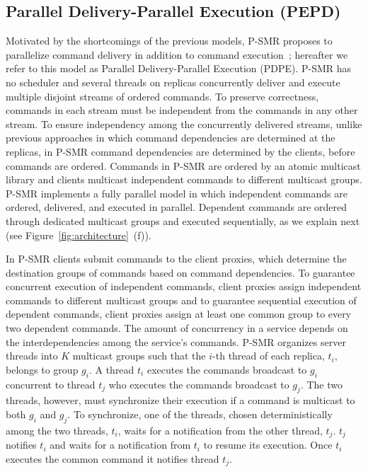 \documentclass[conference]{IEEEtran}
\begin{document}
\subsection{Parallel Delivery-Parallel Execution (PEPD)}
\label{sec:pepd}







Motivated by the shortcomings of the previous models, P-SMR proposes to parallelize command delivery in addition to command execution~\cite{p-smr}; hereafter we refer to this model as Parallel Delivery-Parallel Execution (PDPE). 
P-SMR has no scheduler and several threads on replicas concurrently deliver and execute multiple disjoint streams of ordered commands. 
To preserve correctness, commands in each stream must be independent from the commands in any other stream. 
To ensure independency among the concurrently delivered streams, unlike previous approaches in which command dependencies are determined at the replicas, in P-SMR command dependencies are determined by the clients, before commands are ordered. 
Commands in P-SMR are ordered by an atomic multicast library and clients multicast independent commands to different multicast groups. 
P-SMR implements a fully parallel model in which independent commands are ordered, delivered, and executed in parallel. 
Dependent commands are ordered through dedicated multicast groups and executed sequentially, as we explain next (see Figure~\ref{fig:architecture}~(f)). 





In P-SMR clients submit commands to the client proxies, which determine the destination groups of commands based on command dependencies. 
To guarantee concurrent execution of independent commands, client proxies assign independent commands to different multicast groups and to guarantee sequential execution of dependent commands, client proxies assign at least one common group to every two dependent commands. 
The amount of concurrency in a service depends on the interdependencies among the service's commands. 
P-SMR organizes server threads into $K$ multicast groups such that the $i$-th thread of each replica, $t_i$, belongs to group $g_i$. 
A thread $t_i$ executes the commands broadcast to $g_i$ concurrent to thread $t_j$ who executes the commands broadcast to $g_j$. 
The two threads, however, must synchronize their execution if a command is multicast to both $g_i$ and $g_j$. 
To synchronize, one of the threads, chosen deterministically among the two threads, $t_i$, waits for a notification from the other thread, $t_j$. 
$t_j$ notifies $t_i$ and waits for a notification from $t_i$ to resume its execution. 
Once $t_i$ executes the common command it notifies thread $t_j$. 
\end{document}
